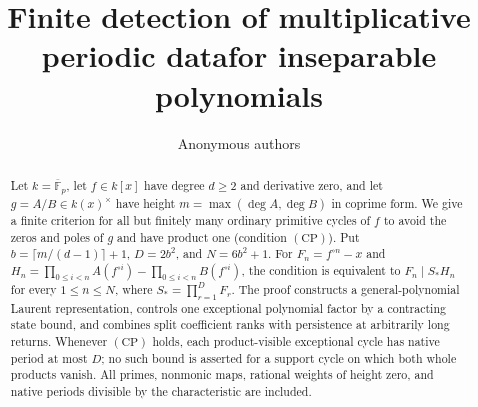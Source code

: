 \documentclass[11pt]{article}
\title{Finite detection of multiplicative periodic data\newline for inseparable polynomials}
\author{Anonymous authors}
\date{}
\theoremstyle{definition}
\numberwithin{equation}{section}
\newcommand{\CP}{\mathrm{(CP)}}
\begin{document}
\maketitle
\begin{abstract}
Let $k=\overline{\mathbb F}_p$, let $f\in k[x]$ have degree $d\ge2$
and derivative zero, and let $g=A/B\in k(x)^\times$ have height
$m=\max(\deg A,\deg B)$ in coprime form. We give a finite criterion
for all but finitely many ordinary primitive cycles of $f$ to avoid
the zeros and poles of $g$ and have product one (condition $\CP$). Put
$b=\lceil m/(d-1)\rceil+1$, $D=2b^2$, and $N=6b^2+1$.
For $F_n=f^{\circ n}-x$ and
$H_n=\prod_{0\le i<n}A(f^{\circ i})-\prod_{0\le i<n}B(f^{\circ i})$,
the condition is equivalent to $F_n\mid S_*H_n$ for every
$1\le n\le N$, where $S_*=\prod_{r=1}^{D}F_r$.
The proof constructs a general-polynomial Laurent representation,
controls one exceptional polynomial factor by a contracting state
bound, and combines split coefficient ranks with persistence at
arbitrarily long returns. Whenever $\CP$ holds, each product-visible
exceptional cycle has native period at most $D$; no such bound is
asserted for a support cycle on which both whole products vanish.
All primes, nonmonic maps, rational weights of height zero, and
native periods divisible by the characteristic are included.
\end{abstract}










\end{document}
